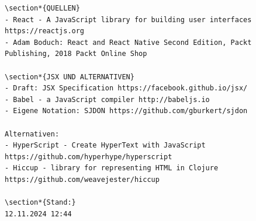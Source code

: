 \documentclass[10pt]{article}
\begin{document}
\begin{verbatim}
\section*{QUELLEN}
- React - A JavaScript library for building user interfaces https://reactjs.org
- Adam Boduch: React and React Native Second Edition, Packt Publishing, 2018 Packt Online Shop

\section*{JSX UND ALTERNATIVEN}
- Draft: JSX Specification https://facebook.github.io/jsx/
- Babel - a JavaScript compiler http://babeljs.io
- Eigene Notation: SJDON https://github.com/gburkert/sjdon

Alternativen:
- HyperScript - Create HyperText with JavaScript https://github.com/hyperhype/hyperscript
- Hiccup - library for representing HTML in Clojure https://github.com/weavejester/hiccup

\section*{Stand:}
12.11.2024 12:44
\end{verbatim}
\end{document}

